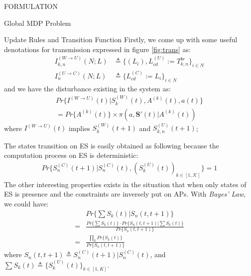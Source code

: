 \documentclass[10pt, conference, letterpaper]{IEEEtran}
\begin{document}
\begin{section}{FORMULATION}
\begin{subsection}{Global MDP Problem}
\begin{subsubsection}{Update Rules and Transition Function}
                Firstly, we come up with some useful denotations for transmission expressed in figure \ref{fig:trans} as:
                \begin{align*}
                    I^{(W \to U)}_{k,n}(N;L) &\triangleq \{ (L_i),L^{(U)}_{cd}:=T^{br}_{k,n} \}_{i \in N}
                        \\
                    I^{(U \to C)}_{n}(N;L) &\triangleq \{ L^{(C)}_{cd}:=L_i \}_{i \in N}
                \end{align*}
                and we have the disturbance existing in the system as:
                \begin{gather*}
                    Pr\{ I^{(W \to U)}(t) | S_{k}^{(W)}(t),A^{(k)}(t), a(t) \}
                    \\
                        = Pr\{ A^{(k)}(t) \} \times \pi(a, \mathbf{S}'(t)|A^{(k)}(t))
                \end{gather*}
                where $I^{(W \to U)}(t)$ implies $S^{(W)}_{k}(t+1)$ and $S^{(U)}_{k,n}(t+1)$;

                The states transition on ES is easily obtained as following because the computation process on ES is deterministic:
                \begin{gather}
                    Pr\{ S_{n}^{(C)}(t+1) |S_{n}^{(C)}(t), (S_{k}^{(U)}(t))_{k \in [1,\mathcal{K}]} \} = 1
                \end{gather}
                The other interesting properties exists in the situation that when only states of ES is presence and the constraints are inversely put on APs. With \emph{Bayes' Law}, we could have:
                \begin{align}
                    & Pr\{ \sum{S_k(t)} | S_n(t,t+1) \} \nonumber\\
                    =& \frac{ Pr\{\sum{S_k(t)}\} \cdot Pr\{S_n(t,t+1)|\sum{S_k(t)}\} }{ Pr\{S_n(t,t+1)\} } \nonumber\\
                    =& \frac{
                            \prod_k Pr\{S_k(t)\}
                        }{
                            Pr\{S_n(t,t+1)\}
                        }
                \end{align}
                where $S_n(t,t+1) \triangleq S_{n}^{(C)}(t+1) |S_{n}^{(C)}(t)$, and $\sum{S_k(t)} \triangleq \{S_{k}^{(U)}(t)\}_{k \in [1,K]}$.
            \end{subsubsection}


\end{subsection}
\end{section}
\end{document}
